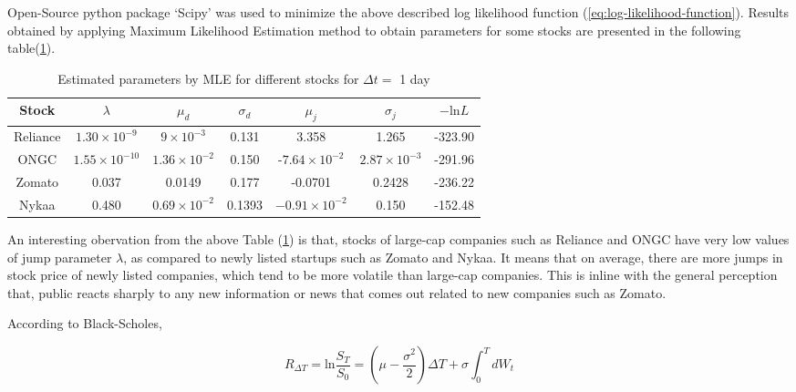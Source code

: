 \documentclass[paper.tex]{subfiles}
\begin{document}
    Open-Source python package `Scipy' was used to minimize the above described log likelihood function (\ref{eq:log-likelihood-function}).
    Results obtained by applying Maximum Likelihood Estimation method to obtain parameters for some stocks are presented in the following table(\ref{tab: model-parameters}).
    
    \begin{table}[ht!]
        \centering
        \begin{tabular}{|c|c|c|c|c|c|c|}
            \hline
            Stock & $ \lambda $ & $ \mu_{d} $ & $ \sigma_{d} $ & $ \mu_{j} $ & $ \sigma_{j} $ & $ -\text{ln}L $\\
            \hline
            \hline
            Reliance & $1.30 \times 10^{-9} $ & $ 9 \times 10^{-3} $ & 0.131 & 3.358 & 1.265 & -323.90\\
            \hline
            ONGC & $ 1.55 \times 10^{-10} $ & $ 1.36 \times 10^{-2} $ & 0.150 & -$ 7.64 \times 10^{-2} $ & $ 2.87 \times 10^{-3} $ & -291.96\\
            \hline
            Zomato & 0.037 & 0.0149 & 0.177 & -0.0701 & 0.2428 & -236.22\\
            \hline
            Nykaa & 0.480 & $ 0.69 \times 10^{-2} $ & 0.1393 & $ -0.91 \times 10^{-2} $ & 0.150 & -152.48\\
            \hline
        \end{tabular}
        \caption{Estimated parameters by MLE for different stocks for $ \Delta t = $ 1 day}
        \label{tab: model-parameters}
    \end{table}
    
    An interesting obervation from the above Table (\ref{tab: model-parameters}) is that, stocks of large-cap companies such as Reliance and ONGC have very low values of jump parameter $ \lambda $, as compared to newly listed startups such as Zomato and Nykaa.
    It means that on average, there are more jumps in stock price of newly listed companies, which tend to be more volatile than large-cap companies.
    This is inline with the general perception that, public reacts sharply to any new information or news that comes out related to new companies such as Zomato.
    
    According to Black-Scholes,
    
    \begin{equation}
        R_{\Delta T} = \text{ln}\dfrac{S_{T}}{S_{0}} =  ( \mu - \dfrac{\sigma^{2}}{2})\Delta T + \sigma \int_{0}^{T} dW_{t}
        \label{eq: log-returns}
    \end{equation}
    
\end{document}
